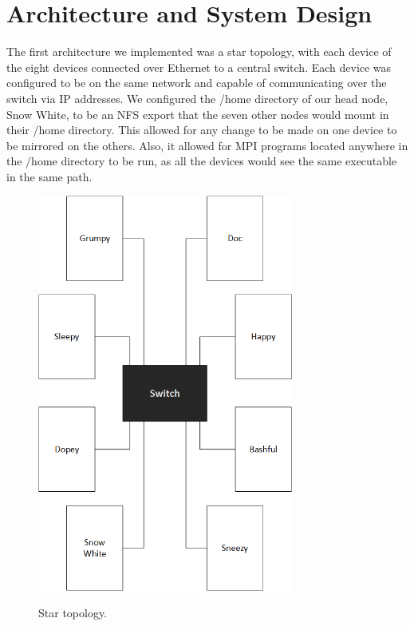  \section{Architecture and System Design}
The first architecture we implemented was a star topology, with each device of the eight devices connected over Ethernet to a central switch. Each device was configured to be on the same network and capable of communicating over the switch via IP addresses. We configured the /home directory of our head node, Snow White, to be an NFS export that the seven other nodes would mount in their /home directory. This allowed for any change to be made on one device to be mirrored on the others. Also, it allowed for MPI programs located anywhere in the /home directory to be run, as all the devices would see the same executable in the same path.

\begin{figure}[tbh]
	\caption{Star topology.}
	\centering
		\includegraphics[width=0.75\textwidth]{cluster_star.png}
	\label{fig:star}
\end{figure}


